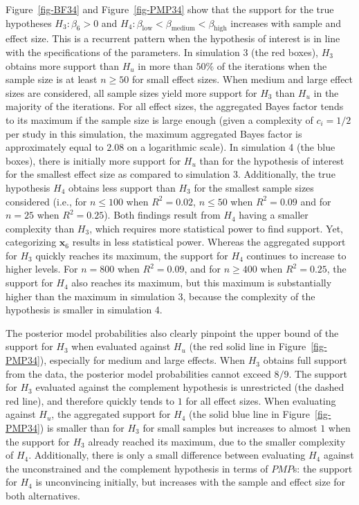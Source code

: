 \documentclass[
]{article}
\begin{document}
Figure~\ref{fig-BF34} and Figure~\ref{fig-PMP34} show that the support
for the true hypotheses \(H_3:\beta_6>0\) and
\(H_4: \beta_{\text{low}} < \beta_{\text{medium}} < \beta_{\text{high}}\)
increases with sample and effect size. This is a recurrent pattern when
the hypothesis of interest is in line with the specifications of the
parameters. In simulation 3 (the red boxes), \(H_3\) obtains more
support than \(H_u\) in more than \(50\%\) of the iterations when the
sample size is at least \(n \geq 50\) for small effect sizes. When
medium and large effect sizes are considered, all sample sizes yield
more support for \(H_3\) than \(H_u\) in the majority of the iterations.
For all effect sizes, the aggregated Bayes factor tends to its maximum
if the sample size is large enough (given a complexity of \(c_i = 1/2\)
per study in this simulation, the maximum aggregated Bayes factor is
approximately equal to \(2.08\) on a logarithmic scale). In simulation 4
(the blue boxes), there is initially more support for \(H_u\) than for
the hypothesis of interest for the smallest effect size as compared to
simulation 3. Additionally, the true hypothesis \(H_4\) obtains less
support than \(H_3\) for the smallest sample sizes considered (i.e., for
\(n \leq 100\) when \(R^2 = 0.02\), \(n \leq 50\) when \(R^2 = 0.09\)
and for \(n = 25\) when \(R^2 = 0.25\)). Both findings result from
\(H_4\) having a smaller complexity than \(H_3\), which requires more
statistical power to find support. Yet, categorizing
\(\boldsymbol{x}_6\) results in less statistical power. Whereas the
aggregated support for \(H_3\) quickly reaches its maximum, the support
for \(H_4\) continues to increase to higher levels. For \(n = 800\) when
\(R^2 = 0.09\), and for \(n \geq 400\) when \(R^2 = 0.25\), the support
for \(H_4\) also reaches its maximum, but this maximum is substantially
higher than the maximum in simulation 3, because the complexity of the
hypothesis is smaller in simulation 4.

The posterior model probabilities also clearly pinpoint the upper bound
of the support for \(H_3\) when evaluated against \(H_u\) (the red solid
line in Figure~\ref{fig-PMP34}), especially for medium and large
effects. When \(H_3\) obtains full support from the data, the posterior
model probabilities cannot exceed \(8/9\). The support for \(H_3\)
evaluated against the complement hypothesis is unrestricted (the dashed
red line), and therefore quickly tends to \(1\) for all effect sizes.
When evaluating against \(H_u\), the aggregated support for \(H_4\) (the
solid blue line in Figure~\ref{fig-PMP34}) is smaller than for \(H_3\)
for small samples but increases to almost \(1\) when the support for
\(H_3\) already reached its maximum, due to the smaller complexity of
\(H_4\). Additionally, there is only a small difference between
evaluating \(H_4\) against the unconstrained and the complement
hypothesis in terms of \(PMP\)s: the support for \(H_4\) is unconvincing
initially, but increases with the sample and effect size for both
alternatives.
\end{document}
